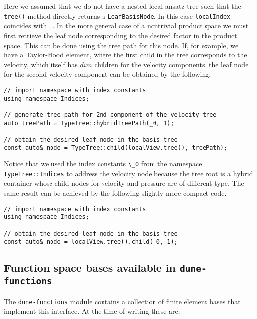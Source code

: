 \documentclass[a4paper,10pt,headings=normal,bibliography=totoc]{scrartcl}
\newcommand{\cpp}[1]{\lstinline[basicstyle=\ttfamily]!#1!}
\newcommand{\dunemodule}[1]{\texttt{#1}}
\begin{document}
Here we assumed that we do not have a nested local ansatz tree
such that the \cpp{tree()} method directly returns a \cpp{LeafBasisNode}.
In this case \cpp{localIndex} coincides with \cpp{i}.
In the more general case of a nontrivial product space
we must first retrieve the leaf node corresponding to
the desired factor in the product space. This can be done
using the tree path for this node. If, for example,
we have a Taylor-Hood element, where the first
child in the tree corresponds to the velocity,
which itself has $dim$ children for the velocity
components, the leaf node for the second velocity
component can be obtained by the following.

\begin{lstlisting}
// import namespace with index constants
using namespace Indices;

// generate tree path for 2nd component of the velocity tree
auto treePath = TypeTree::hybridTreePath(_0, 1);

// obtain the desired leaf node in the basis tree
const auto& node = TypeTree::child(localView.tree(), treePath);
\end{lstlisting}

Notice that we used the index constants \cpp{\_0}
from the namespace \cpp{TypeTree::Indices}
to address the velocity node because the
tree root is a hybrid container whose child nodes
for velocity and pressure are of different type.
The same result can be achieved by the following
slightly more compact code.

\begin{lstlisting}
// import namespace with index constants
using namespace Indices;

// obtain the desired leaf node in the basis tree
const auto& node = localView.tree().child(_0, 1);
\end{lstlisting}




\subsection{Function space bases available in \texorpdfstring{\dunemodule{dune-functions}}{dune-functions}}
\label{subsec:available_bases}

The \dunemodule{dune-functions} module contains a collection of finite element bases that implement
this interface.  At the time of writing these are:
\end{document}

